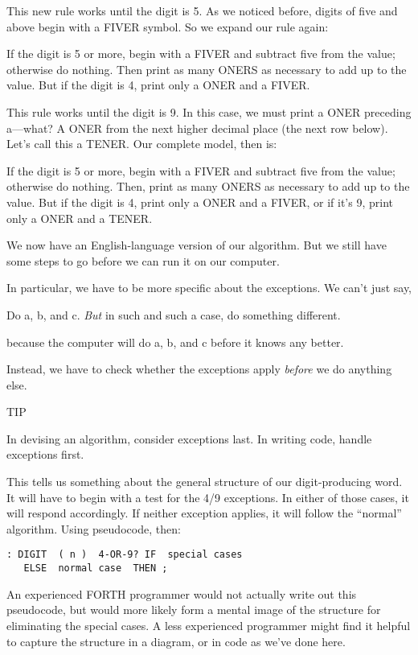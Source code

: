 This new rule works until the digit is 5. As we noticed before, digits of
five and above begin with a FIVER symbol. So we expand our rule again:

If the digit is 5 or more, begin with a FIVER and subtract five from the
value; otherwise do nothing. Then print as many ONERS as necessary to
add up to the value. But if the digit is 4, print only a ONER and a FIVER.

This rule works until the digit is 9. In this case, we must print a ONER
preceding a---what? A ONER from the next higher decimal place (the
next row below). Let's call this a TENER. Our complete model, then is:

If the digit is 5 or more, begin with a FIVER and subtract five from the
value; otherwise do nothing. Then, print as many ONERS as necessary to
add up to the value. But if the digit is 4, print only a ONER and a FIVER,
or if it's 9, print only a ONER and a TENER.

We now have an English-language version of our algorithm. But we still
have some steps to go before we can run it on our computer.

In particular, we have to be more specific about the exceptions. We
can't just say,

Do a, b, and c. \emph{But} in such and such a case, do something different.

because the computer will do a, b, and c before it knows any better.

Instead, we have to check whether the exceptions apply \emph{before} we
do anything else.

TIP

In devising an algorithm, consider exceptions last. In writing code, handle
exceptions first.

This tells us something about the general structure of our digit-producing
word. It will have to begin with a test for the 4/9 exceptions. In
either of those cases, it will respond accordingly. If neither exception
applies, it will follow the ``normal'' algorithm. Using pseudocode, then:

\begin{verbatim}
: DIGIT  ( n )  4-OR-9? IF  special cases
   ELSE  normal case  THEN ;
\end{verbatim}

An experienced FORTH programmer would not actually write out this
pseudocode, but would more likely form a mental image of the structure
for eliminating the special cases. A less experienced programmer might
find it helpful to capture the structure in a diagram, or in code as we've
done here.

